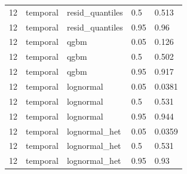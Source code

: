 \begin{tabular}{lllll}
12 & temporal & resid\_quantiles & 0.5 & 0.513 \\
12 & temporal & resid\_quantiles & 0.95 & 0.96 \\
12 & temporal & qgbm & 0.05 & 0.126 \\
12 & temporal & qgbm & 0.5 & 0.502 \\
12 & temporal & qgbm & 0.95 & 0.917 \\
12 & temporal & lognormal & 0.05 & 0.0381 \\
12 & temporal & lognormal & 0.5 & 0.531 \\
12 & temporal & lognormal & 0.95 & 0.944 \\
12 & temporal & lognormal\_het & 0.05 & 0.0359 \\
12 & temporal & lognormal\_het & 0.5 & 0.531 \\
12 & temporal & lognormal\_het & 0.95 & 0.93 \\
\bottomrule
\end{tabular}